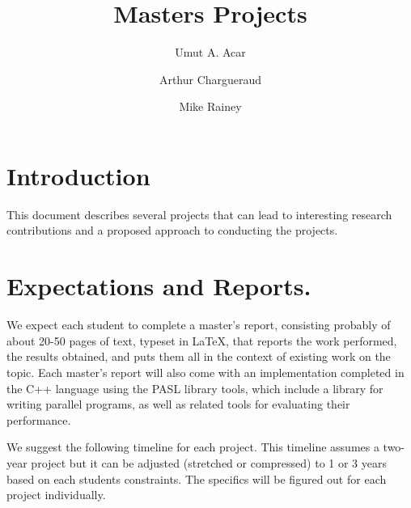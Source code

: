 \documentclass[11pt]{article}
\title{Masters Projects}
\author{Umut A. Acar \and Arthur Chargueraud \and Mike Rainey}
\begin{document}
\maketitle

\section{Introduction}

This document describes several projects that can lead to interesting
research contributions and a proposed approach to conducting the
projects.

\section{Expectations and Reports.}

We expect each student to complete a master's report, consisting
probably of about 20-50 pages of text, typeset in LaTeX, that reports
the work performed, the results obtained, and puts them all in the
context of existing work on the topic.  Each master's report will also
come with an implementation completed in the C++ language using the
PASL library tools, which include a library for writing parallel
programs, as well as related tools for evaluating their performance.

We suggest the following timeline for each project.  This timeline
assumes a two-year project but it can be adjusted (stretched or
compressed) to 1 or 3 years based on each students constraints.  The
specifics will  be figured out for each project individually.
\end{document}
